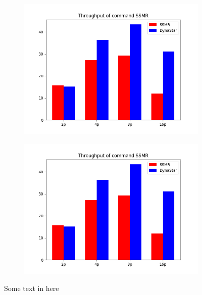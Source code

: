 \begin{figure}[h!]
  \begin{subfigure}{.4\textwidth}
    \centering
    \includegraphics[width=\textwidth]{./figures/eurosys/mix.png}
  \end{subfigure}
  \begin{subfigure}{.4\textwidth}
    \centering
    \includegraphics[width=\textwidth]{./figures/eurosys/mix.png}
  \end{subfigure}
  \caption{Some text in here}%
  \label{fig:socialscalability}
\end{figure}



